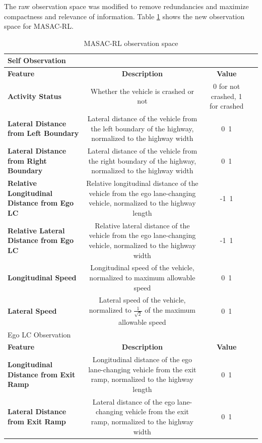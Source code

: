 \documentclass[12pt, a4paper]{report}
\begin{document}
The raw observation space was modified to remove redundancies and maximize compactness and relevance of information. Table \ref{tab:masac_feature_space} shows the new observation space for MASAC-RL.

\begin{table}[htbp]
    \centering
    \caption{MASAC-RL observation space}
    \label{tab:masac_feature_space}
    \renewcommand{\arraystretch}{1.2} %
    \begin{tabular}{lccc}
        \toprule
        \midrule
        Self Observation \\
        \midrule
        \textbf{Feature} & \textbf{Description} & \textbf{Value} \\
        \textbf{Activity Status} &  Whether the vehicle is crashed or not & 0 for not crashed, 1 for crashed \\
        \textbf{Lateral Distance from Left Boundary} &  Lateral distance of the vehicle from the left boundary of the highway, normalized to the highway width & 0~1 \\
        \textbf{Lateral Distance from Right Boundary} &  Lateral distance of the vehicle from the right boundary of the highway, normalized to the highway width & 0~1 \\
        \textbf{Relative Longitudinal Distance from Ego LC} &  Relative longitudinal distance of the vehicle from the ego lane-changing vehicle, normalized to the highway length & -1~1 \\
        \textbf{Relative Lateral Distance from Ego LC} &  Relative lateral distance of the vehicle from the ego lane-changing vehicle, normalized to the highway width & -1~1 \\
        \textbf{Longitudinal Speed} &  Longitudinal speed of the vehicle, normalized to maximum allowable speed & 0~1 \\
        \textbf{Lateral Speed} &  Lateral speed of the vehicle, normalized to $\frac{1}{\sqrt{2}}$ of the maximum allowable speed & 0~1 \\
        \midrule
        Ego LC Observation \\
        \midrule
        \textbf{Feature} & \textbf{Description} & \textbf{Value} \\
        \textbf{Longitudinal Distance from Exit Ramp} &  Longitudinal distance of the ego lane-changing vehicle from the exit ramp, normalized to the highway length & 0~1 \\
        \textbf{Lateral Distance from Exit Ramp} &  Lateral distance of the ego lane-changing vehicle from the exit ramp, normalized to the highway width & 0~1 \\

\end{tabular}
\end{table}
\end{document}
